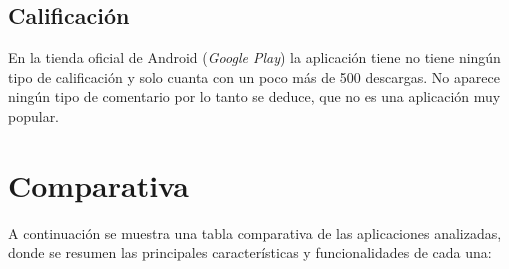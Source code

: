\documentclass{article}
\begin{document}
\subsection{Calificación}
En la tienda oficial de Android (\textit{Google Play}) la aplicación tiene no tiene ningún tipo de calificación y solo cuanta con un poco más de 500 descargas. 
No aparece ningún tipo de comentario por lo tanto se deduce, que no es una aplicación muy popular. 


\section{Comparativa}

A continuación se muestra una tabla comparativa de las aplicaciones analizadas, donde se resumen las principales características y funcionalidades de cada una: 

\begin{table}[ht]
    \centering

\end{table}
\end{document}

